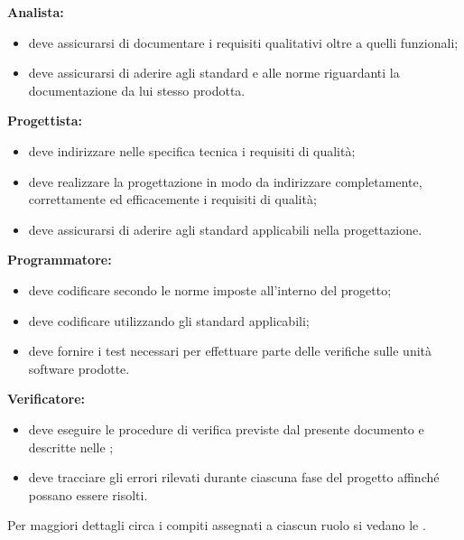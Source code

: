 \documentclass[../PianoDiQualifica.tex]{subfiles}
\begin{document}
			\textbf{Analista:}
			\begin{itemize}
				\item deve assicurarsi di documentare i requisiti qualitativi oltre a quelli funzionali;
				\item deve assicurarsi di aderire agli standard e alle norme riguardanti la documentazione da lui stesso prodotta.
			\end{itemize}
			\textbf{Progettista:}
			\begin{itemize}
				\item deve indirizzare nelle specifica tecnica i requisiti di qualità;
				\item deve realizzare la progettazione in modo da indirizzare completamente, correttamente ed efficacemente i requisiti di qualità;
				\item deve assicurarsi di aderire agli standard applicabili nella progettazione.
			\end{itemize}
			\textbf{Programmatore:}
			\begin{itemize}
				\item deve codificare secondo le norme imposte all'interno del progetto;
				\item deve codificare utilizzando gli standard applicabili;
				\item deve fornire i test necessari per effettuare parte delle verifiche sulle unità software prodotte.
			\end{itemize}
			\textbf{Verificatore:}
			\begin{itemize}
				\item deve eseguire le procedure di verifica previste dal presente documento e descritte nelle \normediprogettov;
				\item deve tracciare gli errori rilevati durante ciascuna fase del progetto affinché possano essere risolti.
			\end{itemize}
		Per maggiori dettagli circa i compiti assegnati a ciascun ruolo si vedano le \normediprogettov.
\end{document}
